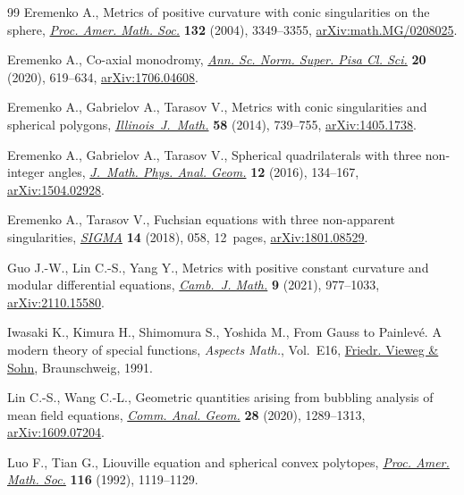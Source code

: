 \documentclass[10pt,a4paper]{amsart}
\numberwithin{equation}{section}
\begin{document}
\begin{thebibliography}{99}
Eremenko A., Metrics of positive curvature with conic singularities on the
 sphere, \href{https://doi.org/10.1090/S0002-9939-04-07439-8}{\textit{Proc. Amer. Math. Soc.}} \textbf{132} (2004), 3349--3355,
 \href{https://arxiv.org/abs/math.MG/0208025}{arXiv:math.MG/0208025}.

Eremenko A., Co-axial monodromy, \href{https://doi.org/10.2422/2036-2145.201706_022}{\textit{Ann. Sc. Norm. Super. Pisa Cl. Sci.}}
 \textbf{20} (2020), 619--634, \href{https://arxiv.org/abs/1706.04608}{arXiv:1706.04608}.

Eremenko A., Gabrielov A., Tarasov V., Metrics with conic singularities and
 spherical polygons, \href{https://doi.org/10.1215/ijm/1441790388}{\textit{Illinois~J.~Math.}} \textbf{58} (2014), 739--755,
 \href{https://arxiv.org/abs/1405.1738}{arXiv:1405.1738}.

Eremenko A., Gabrielov A., Tarasov V., Spherical quadrilaterals with three
 non-integer angles, \href{https://doi.org/10.15407/mag12.02.134}{\textit{J.~Math. Phys. Anal. Geom.}} \textbf{12} (2016),
 134--167, \href{https://arxiv.org/abs/1504.02928}{arXiv:1504.02928}.

Eremenko A., Tarasov V., Fuchsian equations with three non-apparent
 singularities, \href{https://doi.org/10.3842/SIGMA.2018.058}{\textit{SIGMA}} \textbf{14} (2018), 058, 12~pages,
 \href{https://arxiv.org/abs/1801.08529}{arXiv:1801.08529}.

Guo J.-W., Lin C.-S., Yang Y., Metrics with positive constant curvature and
 modular differential equations, \href{https://doi.org/10.4310/CJM.2021.v9.n4.a3}{\textit{Camb.~J. Math.}} \textbf{9} (2021),
 977--1033, \href{https://arxiv.org/abs/2110.15580}{arXiv:2110.15580}.

Iwasaki K., Kimura H., Shimomura S., Yoshida M., From {G}auss to {P}ainlev\'e.
 A modern theory of special functions, \textit{Aspects Math.}, Vol.~E16,
 \href{https://doi.org/10.1007/978-3-322-90163-7}{Friedr. Vieweg \& Sohn}, Braunschweig, 1991.

Lin C.-S., Wang C.-L., Geometric quantities arising from bubbling analysis of
 mean field equations, \href{https://doi.org/10.4310/CAG.2020.v28.n6.a2}{\textit{Comm. Anal. Geom.}} \textbf{28} (2020),
 1289--1313, \href{https://arxiv.org/abs/1609.07204}{arXiv:1609.07204}.

Luo F., Tian G., Liouville equation and spherical convex polytopes,
 \href{https://doi.org/10.2307/2159498}{\textit{Proc. Amer. Math. Soc.}} \textbf{116} (1992), 1119--1129.


\end{thebibliography}
\end{document}
